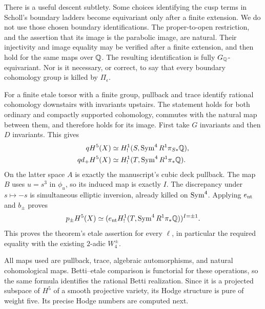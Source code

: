 There is a useful descent subtlety. Some choices identifying the cusp terms
in Scholl's boundary ladders become equivariant only after a finite extension.
We do not use those chosen boundary identifications. The proper-to-open
restriction, and the assertion that its image is the parabolic image, are
natural. Their injectivity and image equality may be verified after a finite
extension, and then hold for the same maps over $\mathbb Q$. The resulting
identification is fully $G_\mathbb Q$-equivariant. Nor is it necessary, or correct,
to say that every boundary cohomology group is killed by $\Pi_\epsilon$.

For a finite etale torsor with a finite group, pullback and trace identify
rational cohomology downstairs with invariants upstairs. The statement holds
for both ordinary and compactly supported cohomology, commutes with the
natural map between them, and therefore holds for its image. First take $G$
invariants and then $D$ invariants. This gives
\[
\begin{aligned}
qH^5(X)&\simeq H^1_!(S,\operatorname{Sym}^4 R^1\pi_{S*}\mathbb Q),\\
qd_+H^5(X)&\simeq H^1_!(T,\operatorname{Sym}^4 R^1\pi_*\mathbb Q).
\end{aligned}
\]
On the latter space $A$ is exactly the manuscript's cubic deck pullback.
The map $B$ uses $u=s^3$ in $\phi_u$, so its induced map is exactly $I$.
The discrepancy under $s\mapsto-s$ is simultaneous elliptic inversion,
already killed on $\operatorname{Sym}^4$. Applying $e_{\mathrm{nt}}$ and $b_\pm$ proves
\[
p_\pm H^5(X)\simeq(e_{\mathrm{nt}} H^1_!(T,\operatorname{Sym}^4 R^1\pi_*\mathbb Q))^{I=\pm1}.
\]
This proves the theorem's etale assertion for every $\ell$, in particular
the required equality with the existing $2$-adic $W_4^\pm$.

All maps used are pullback, trace, algebraic automorphisms, and natural
cohomological maps. Betti--etale comparison is functorial for these operations,
so the same formula identifies the rational Betti realization. Since it is a
projected subspace of $H^5$ of a smooth projective variety, its Hodge structure
is pure of weight five. Its precise Hodge numbers are computed next.



